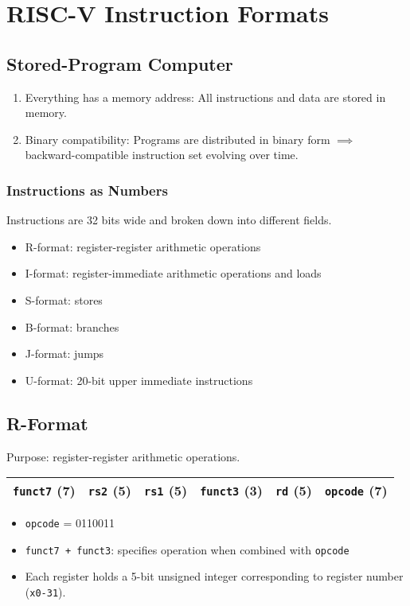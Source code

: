 \chapter{RISC-V Instruction Formats}

\section{Stored-Program Computer}
\begin{enumerate}
    \item Everything has a memory address: All instructions and data are stored in memory.
    \item Binary compatibility: Programs are distributed in binary form $\implies$ backward-compatible instruction set evolving over time.
\end{enumerate}

\subsection{Instructions as Numbers}
Instructions are 32 bits wide and broken down into different fields.
\begin{itemize}
    \item R-format: register-register arithmetic operations
    \item I-format: register-immediate arithmetic operations and loads
    \item S-format: stores
    \item B-format: branches
    \item J-format: jumps
    \item U-format: 20-bit upper immediate instructions
\end{itemize}

\section{R-Format}
Purpose: register-register arithmetic operations.

\medskip
\begin{tabular}{|c|c|c|c|c|c|}
    \hline
    \texttt{funct7} (7) &
    \texttt{rs2} (5) &
    \texttt{rs1} (5) &
    \texttt{funct3} (3) &
    \texttt{rd} (5) &
    \texttt{opcode} (7) \\
    \hline
\end{tabular}
\begin{itemize}
    \item \texttt{opcode} = 0110011
    \item \texttt{funct7 + funct3}: specifies operation when combined with \texttt{opcode}
    \item Each register holds a 5-bit unsigned integer corresponding to register number (\texttt{x0-31}).
\end{itemize}

